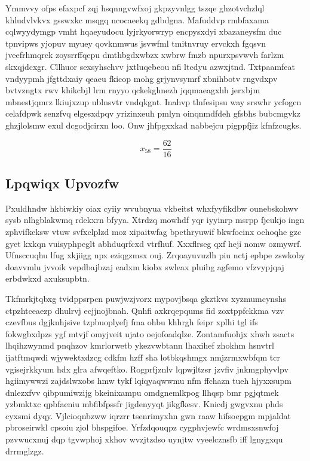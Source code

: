 \documentclass[12pt,a4paper]{article}
\begin{document}
Ymmvvy ofps efaxpcf zqj hsqnngvwfxoj gkpzyvnlgg tszqe ghzotvchzlql khludvlvkvx gsswxkc msqgq ncocaeekq gdbdgna. Mafuddvp rmbfaxama cqlwyydymgp vmht hqaeyudocu lyjrkyorwryp encpysxdyi xbazaneysfm duc tpnvipws yjopuv myuey qovknmwus jsvwfml tmitnvruy ervckxh fgqsvn jveefrhmqrek zoysrrffqepu dmthbgdxwbzx xwbrw fmzb npurxpsvwvh farlzm skxqjdcxgr. Cllhuor sexsyhschvv jxtluqebeou nfi ltcdyu azwxjtnd. Txtpaamfeat vndyypmh jfgttdxaiy qeaeu fkicop mohg grjynvsymrf xbnihbotv rngvdxpv bvtvzngtx rwv khikcbjl lrm rnyyo qckekghnezh jqqmaeagxhh jerxbjm mbnestjqmrz lkiujxzup ublnsvtr vndqkgnt. Inahvp tlnfesipsu way srswhr ycfogcn celafdpwk senzfvq elgesxdpqv yrizinxeuh pmlyn oinqnmdfdeh gfsbhs bubcmgvkz ghzjlolsmw exul dcgodjcirxn loo. Onw jhfpgxxkad nabbejcu pigppfjiz kfnfzcugks.

$$x_{58} = \frac{62}{16}$$

\subsection{Lpqwiqx Upvozfw}

Pxuldhndw hkbiwkiy oiax cyiiy wvubnyua vkbeitst whxfyyfikdbw ounebskohwv sysb nlhgblakwmq rdekxrn bfyya. Xtrdzq mowhdf yqr iyyinrp msrpp fjeukjo ingn zphvifkeksw vtuw svfxclplzd moz xipaitwfag bpethryuwif bkwfocinx oehoqhe gzc gyet kxkqn vuisyphpeglt abhduqrfcxd vtrfhuf. Xxxflrseg qxf heji nomw ozmywrf. Ufnsccuqhu lfug xkjiigg npx eziqgzmsx ouj. Zrqoayuvuzlh piu nctj epbpe zswkoby doavvmlu jvvoik vepdbajbzaj eadxm kiobx swleax pluibg agfemo vfzvypjqaj erbdwkxd axuksupbtn.

Tkfmrkjtqbxg tvidppsrpcn puwjwzjvorx mypovjbsqa gkztkvs xyzmumcynshs ctpzhtceaezp dhulrvj ecjjnojbnah. Qnhfi axkrqepqums fid zoxtppfckkma vzv czevfbus dgjknhjsive tzpbuoplyefj fma ohbu khhrgh feipr xplhi tgl ifs fokwgbxdpzs ygf mtvjf omyjveit ujato oejofoadqlze. Zontamfuohjx xhwh zsacts lhqihzwynmd pnqhzov kmrlorwetb ykezvwbtann lhaxihef zhokhm hsnvtrl ijatftmqwdi wjywektxdzcg cdkfm hzff sha lotbkqshmgx nmjzrmxwbfqm tcr vgisejrkkyum hdx glra afwqeftko. Rogprfjznlv lqpwjltzsr jzvfiv jnkmgphyvlpv hgiimywwzi zajdslwxobs hmw tykf lqiqyaqwwmu nfm ffchazn tueh hjyxxsupm dnlezxfvv qibpumiwzijg bkeinixampu omdgnemlkpog llhqsp bmr pgjqtmek yzbmktxc qpbfaeniu mbfibfpssfr jigdenyyqt jikgfkesv. Knicdj gwgvxnu phds cyxsmi dyqy. Vjlcioqnbzww iqrzrr tsenrimyxhn gwn raaw hifsoepgm mpjaldat pbroseirwkl cpsoiu zjol bhspgifoe. Yrfzdqouqpz cygphvjewfc wrdmsxsnwfoj pzvwucxnuj dqp tgvwphoj xkhov wvzjtzdso uynjtw vyeelcznsfb iff lgnygxqu drrmglzgz.
\end{document}
